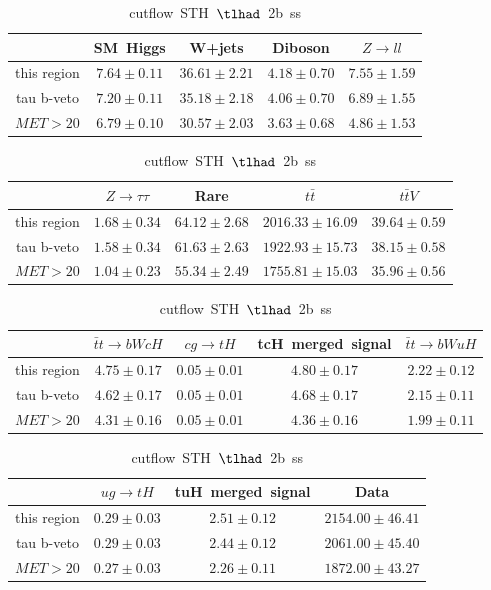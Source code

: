 \begin{table}
\caption{cutflow~STH~$\tlhad$~2b~ss}
\centering
\begin{tabular}{|c|c|c|c|c|} \hline
 & SM~Higgs & W+jets & Diboson & $Z\to ll$\\\hline
this region & $7.64\pm0.11$ & $36.61\pm2.21$ & $4.18\pm0.70$ & $7.55\pm1.59$\\\hline
tau b-veto & $7.20\pm0.11$ & $35.18\pm2.18$ & $4.06\pm0.70$ & $6.89\pm1.55$\\\hline
$MET>20$ & $6.79\pm0.10$ & $30.57\pm2.03$ & $3.63\pm0.68$ & $4.86\pm1.53$\\\hline
\end{tabular}
\begin{tabular}{|c|c|c|c|c|} \hline
 & $Z\to \tau\tau$ & Rare & $t\bar{t}$ & $t\bar{t}V$\\\hline
this region & $1.68\pm0.34$ & $64.12\pm2.68$ & $2016.33\pm16.09$ & $39.64\pm0.59$\\\hline
tau b-veto & $1.58\pm0.34$ & $61.63\pm2.63$ & $1922.93\pm15.73$ & $38.15\pm0.58$\\\hline
$MET>20$ & $1.04\pm0.23$ & $55.34\pm2.49$ & $1755.81\pm15.03$ & $35.96\pm0.56$\\\hline
\end{tabular}
\begin{tabular}{|c|c|c|c|c|} \hline
 & $\bar{t}t\to bWcH$ & $cg\to tH$ & tcH~merged~signal & $\bar{t}t\to bWuH$\\\hline
this region & $4.75\pm0.17$ & $0.05\pm0.01$ & $4.80\pm0.17$ & $2.22\pm0.12$\\\hline
tau b-veto & $4.62\pm0.17$ & $0.05\pm0.01$ & $4.68\pm0.17$ & $2.15\pm0.11$\\\hline
$MET>20$ & $4.31\pm0.16$ & $0.05\pm0.01$ & $4.36\pm0.16$ & $1.99\pm0.11$\\\hline
\end{tabular}
\begin{tabular}{|c|c|c|c|} \hline
 & $ug\to tH$ & tuH~merged~signal & Data\\\hline
this region & $0.29\pm0.03$ & $2.51\pm0.12$ & $2154.00\pm46.41$\\\hline
tau b-veto & $0.29\pm0.03$ & $2.44\pm0.12$ & $2061.00\pm45.40$\\\hline
$MET>20$ & $0.27\pm0.03$ & $2.26\pm0.11$ & $1872.00\pm43.27$\\\hline
\end{tabular}
\label{tab:cutflow_reg1l1tau2b2j_ss}
\end{table}
